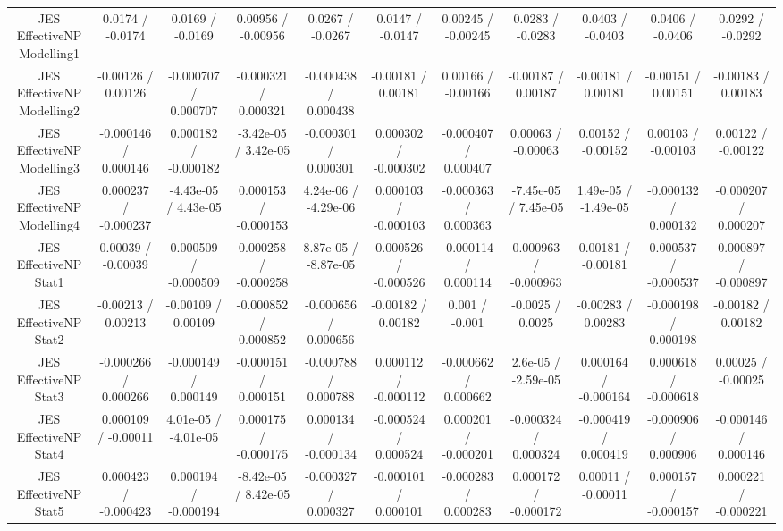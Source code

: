 \begin{table}[htbp]
\begin{center}
\begin{tabular}{|c|c|c|c|c|c|c|c|c|c|c|}
  JES EffectiveNP Modelling1 & 0.0174 / -0.0174 & 0.0169 / -0.0169 & 0.00956 / -0.00956 & 0.0267 / -0.0267 & 0.0147 / -0.0147 & 0.00245 / -0.00245 & 0.0283 / -0.0283 & 0.0403 / -0.0403 & 0.0406 / -0.0406 & 0.0292 / -0.0292 \\ 
  JES EffectiveNP Modelling2 & -0.00126 / 0.00126 & -0.000707 / 0.000707 & -0.000321 / 0.000321 & -0.000438 / 0.000438 & -0.00181 / 0.00181 & 0.00166 / -0.00166 & -0.00187 / 0.00187 & -0.00181 / 0.00181 & -0.00151 / 0.00151 & -0.00183 / 0.00183 \\ 
  JES EffectiveNP Modelling3 & -0.000146 / 0.000146 & 0.000182 / -0.000182 & -3.42e-05 / 3.42e-05 & -0.000301 / 0.000301 & 0.000302 / -0.000302 & -0.000407 / 0.000407 & 0.00063 / -0.00063 & 0.00152 / -0.00152 & 0.00103 / -0.00103 & 0.00122 / -0.00122 \\ 
  JES EffectiveNP Modelling4 & 0.000237 / -0.000237 & -4.43e-05 / 4.43e-05 & 0.000153 / -0.000153 & 4.24e-06 / -4.29e-06 & 0.000103 / -0.000103 & -0.000363 / 0.000363 & -7.45e-05 / 7.45e-05 & 1.49e-05 / -1.49e-05 & -0.000132 / 0.000132 & -0.000207 / 0.000207 \\ 
  JES EffectiveNP Stat1 & 0.00039 / -0.00039 & 0.000509 / -0.000509 & 0.000258 / -0.000258 & 8.87e-05 / -8.87e-05 & 0.000526 / -0.000526 & -0.000114 / 0.000114 & 0.000963 / -0.000963 & 0.00181 / -0.00181 & 0.000537 / -0.000537 & 0.000897 / -0.000897 \\ 
  JES EffectiveNP Stat2 & -0.00213 / 0.00213 & -0.00109 / 0.00109 & -0.000852 / 0.000852 & -0.000656 / 0.000656 & -0.00182 / 0.00182 & 0.001 / -0.001 & -0.0025 / 0.0025 & -0.00283 / 0.00283 & -0.000198 / 0.000198 & -0.00182 / 0.00182 \\ 
  JES EffectiveNP Stat3 & -0.000266 / 0.000266 & -0.000149 / 0.000149 & -0.000151 / 0.000151 & -0.000788 / 0.000788 & 0.000112 / -0.000112 & -0.000662 / 0.000662 & 2.6e-05 / -2.59e-05 & 0.000164 / -0.000164 & 0.000618 / -0.000618 & 0.00025 / -0.00025 \\ 
  JES EffectiveNP Stat4 & 0.000109 / -0.00011 & 4.01e-05 / -4.01e-05 & 0.000175 / -0.000175 & 0.000134 / -0.000134 & -0.000524 / 0.000524 & 0.000201 / -0.000201 & -0.000324 / 0.000324 & -0.000419 / 0.000419 & -0.000906 / 0.000906 & -0.000146 / 0.000146 \\ 
  JES EffectiveNP Stat5 & 0.000423 / -0.000423 & 0.000194 / -0.000194 & -8.42e-05 / 8.42e-05 & -0.000327 / 0.000327 & -0.000101 / 0.000101 & -0.000283 / 0.000283 & 0.000172 / -0.000172 & 0.00011 / -0.00011 & 0.000157 / -0.000157 & 0.000221 / -0.000221 \\ 

\end{tabular}
\end{center}
\end{table}
